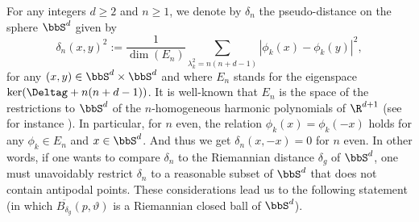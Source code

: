 For any integers $d\geq 2$ and $n\geq 1$, we denote by $\delta_n$ the pseudo-distance on the sphere $\bbS^d$ given by\vspace*{-3pt}
\begin{equation}\label{defipseu}
\delta_n(x,y)^2:= \frac{1}{\dim(E_n)}\sum_{\lambda_k^2=n(n+d-1)} |\phi_{k}(x)-\phi_{k}(y)|^2,
\end{equation}
for any $(x,y)\in \bbS^d\times \bbS^d$ and where $E_n$ stands for the eigenspace $\ker(\Deltag+n(n+d-1))$.
It is well-known that $E_n$ is the space of the restrictions to $\bbS^{d}$ of the $n$-homogeneous harmonic polynomials of $\R^{d+1}$ (see for instance \cite[Prop.\,9.3.5]{faraut}). In particular, for $n$ even, the relation $\phi_k(x)=\phi_k(-x)$ holds for any $\phi_k\in E_n$ and $x\in \bbS^{d}$. And thus we get $\delta_n(x,-x)=0$ for $n$ even.
In other words, if one wants to compare $\delta_n$ to the Riemannian distance $\delta_{g}$ of $\bbS^d$, one must unavoidably restrict $\delta_n$ to a reasonable subset of $\bbS^d$ that does not contain antipodal points. These considerations lead us to the following statement (in which $\overline{B_{\delta_g}}(p,\vartheta)$ is a Riemannian closed ball of $\bbS^d$).

